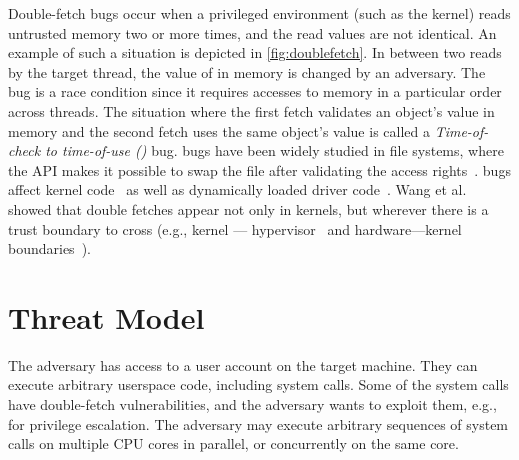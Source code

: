 \documentclass[letterpaper,twocolumn,10pt]{article}
\begin{document}
Double-fetch bugs occur when a privileged environment (such as the kernel)
reads untrusted memory two or more times, and the read values are not 
identical. 
An example of such a situation is depicted in \autoref{fig:doublefetch}.
In between two reads by the target thread, the value of  in memory 
is changed by an adversary.
The bug is a race condition since it requires accesses to memory in 
a particular order across threads.
The situation where the first fetch validates an object's value in memory and 
the second fetch uses the same object's value is called a 
\emph{Time-of-check to time-of-use (\tocttou)} bug.
\tocttou bugs have been widely studied in file systems, where the 
API makes it possible to swap the file after validating the access 
rights~\cite{payer2012protecting,
pu2006methodical, wei2010modeling, tsafrir2008portably,Garfinkel03}.
\tocttou bugs affect kernel code~\cite{jurczyk2013bochspwn, wang2018survey}
as well as dynamically loaded driver code~\cite{cve201812633,cve201812633fix}.
Wang et al.~\cite{wang2018survey} showed that double fetches appear not only
in kernels, but wherever there is a trust boundary to cross (e.g., kernel ---
hypervisor~\cite{wilhelm2016xenpwn} and hardware---kernel
boundaries~\cite{lu2018untrusted}). 




\section{Threat Model}
\label{sec:threatmodel}

The adversary has access to a user account on the target machine. They can
execute arbitrary userspace code, including system calls. Some of the system 
calls have double-fetch vulnerabilities, and the adversary wants to exploit them,
e.g., for privilege escalation.
The adversary may execute arbitrary sequences of system calls on multiple CPU
cores in parallel, or concurrently on the same core.
\end{document}
